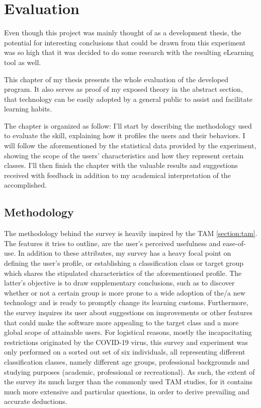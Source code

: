 \chapter{Evaluation}
\label{cha:evaluation}

Even though this project was mainly thought of as a development thesis,
the potential for interesting conclusions that 
could be drawn from this experiment was so high that it was decided 
to do some research with the resulting eLearning tool as well.

This chapter of my thesis presents the whole evaluation of the 
developed program. It also serves as proof of my exposed theory in 
the abstract section, that technology can be easily adopted by 
a general public to assist and facilitate learning habits.

The chapter is organized as follow: I'll start by describing 
the methodology used to evaluate the skill, explaining how 
it profiles the users and their behaviors. I will follow 
the aforementioned by the statistical data provided 
by the experiment, showing the scope of the users' 
characteristics and how they represent certain classes. 
I'll then finish the chapter with the valuable results 
and suggestions received with feedback in addition to 
my academical interpretation of the accomplished.


\section{Methodology}

The methodology behind the survey is heavily inspired by the TAM \ref{section:tam}. 
The features it tries to outline, 
are the user's perceived usefulness and ease-of-use. 
In addition to these attributes, my survey has a heavy focal 
point on defining the user's profile, or establishing a 
classification class or target group which shares the stipulated 
characteristics of the aforementioned profile. The latter's 
objective is to draw supplementary conclusions, such as to 
discover whether or not a certain group is more prone to a 
wide adoption of the/a new technology and is ready to promptly 
change its learning customs.
Furthermore, the survey inquires its user about suggestions 
on improvements or other features that could make the 
software more appealing to the target class and a more 
global scope of attainable users.
For logistical reasons, mostly the incapacitating restrictions 
originated by the COVID-19 virus, 
this survey and experiment was only performed on 
a sorted out set of six individuals, 
all representing different classification classes, namely different 
age groups, professional backgrounds and studying purposes 
(academic, professional or recreational).
As such, the extent of the survey its 
much larger than the commonly used TAM studies, 
for it contains much more extensive and 
particular questions, in order to derive prevailing 
and accurate deductions.


